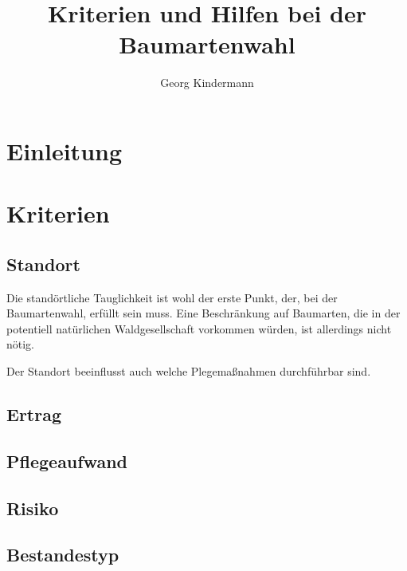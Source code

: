 \documentclass[twocolumn]{scrartcl}
\title{Kriterien und Hilfen bei der Baumartenwahl}
\author{Georg Kindermann}
\begin{document}
\twocolumn[
  \begin{@twocolumnfalse}
    \maketitle
    \begin{abstract}

    \end{abstract}
  \end{@twocolumnfalse}
]

\tableofcontents

\section{Einleitung}

\section{Kriterien}
\label{sec:kriterien}

\subsection{Standort}
\label{ssec:standort}

Die standörtliche Tauglichkeit ist wohl der erste Punkt, der, bei der
Baumartenwahl, erfüllt sein muss. Eine Beschränkung auf Baumarten, die
in der potentiell natürlichen Waldgesellschaft vorkommen würden, ist
allerdings nicht nötig.

Der Standort beeinflusst auch welche Plegemaßnahmen durchführbar sind.

\subsection{Ertrag}
\label{ssec:ertrag}

\subsection{Pflegeaufwand}
\label{ssec:pflegeaufwand}

\subsection{Risiko}
\label{ssec:risiko}

\subsection{Bestandestyp}
\label{ssec:bestandestyp}
\end{document}
